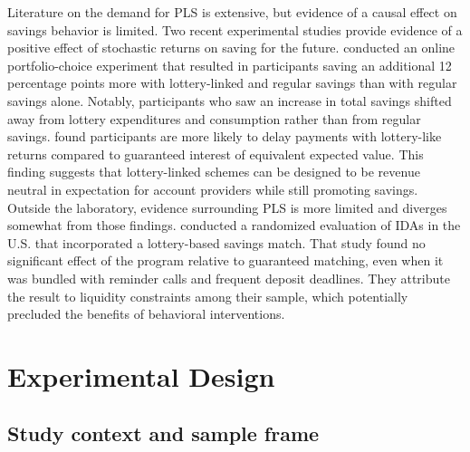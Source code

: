 \documentclass[11pt]{article}
\begin{document}
	Literature on the demand for PLS is extensive, but evidence of a causal effect on savings behavior is limited. Two recent experimental studies provide evidence of a positive effect of stochastic returns on saving for the future.  conducted an online portfolio-choice experiment that resulted in participants saving an additional 12 percentage points more with lottery-linked and regular savings than with regular savings alone. Notably, participants who saw an increase in total savings shifted away from lottery expenditures and consumption rather than from regular savings.  found participants are more likely to delay payments with lottery-like returns compared to guaranteed interest of equivalent expected value. This finding suggests that lottery-linked schemes can be designed to be revenue neutral in expectation for account providers while still promoting savings. Outside the laboratory, evidence surrounding PLS is more limited and diverges somewhat from those findings.  conducted a randomized evaluation of IDAs in the U.S. that incorporated a lottery-based savings match. That study found no significant effect of the program relative to guaranteed matching, even when it was bundled with reminder calls and frequent deposit deadlines. They attribute the result to liquidity constraints among their sample, which potentially precluded the benefits of behavioral interventions.


\section{Experimental Design} \label{sec:design}

	\subsection{Study context and sample frame}
\end{document}
